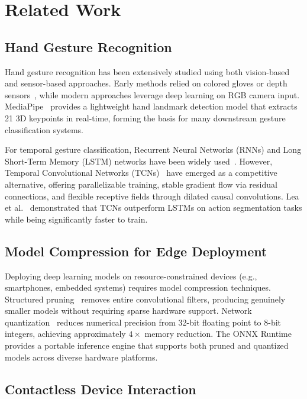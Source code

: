 \section{Related Work}
\label{sec:related_work}

\subsection{Hand Gesture Recognition}

Hand gesture recognition has been extensively studied using both
vision-based and sensor-based approaches. Early methods relied on colored
gloves or depth sensors~\cite{rautaray2015vision}, while modern
approaches leverage deep learning on RGB camera input.
MediaPipe~\cite{zhang2020mediapipe} provides a lightweight hand
landmark detection model that extracts 21 3D keypoints in real-time,
forming the basis for many downstream gesture classification systems.

For temporal gesture classification, Recurrent Neural Networks (RNNs)
and Long Short-Term Memory (LSTM) networks have been widely
used~\cite{pigou2018gesture}. However, Temporal Convolutional Networks
(TCNs)~\cite{bai2018empirical, lea2017temporal} have emerged as a
competitive alternative, offering parallelizable training, stable
gradient flow via residual connections, and flexible receptive fields
through dilated causal convolutions. Lea et al.~\cite{lea2017temporal}
demonstrated that TCNs outperform LSTMs on action segmentation tasks
while being significantly faster to train.

\subsection{Model Compression for Edge Deployment}

Deploying deep learning models on resource-constrained devices (e.g.,
smartphones, embedded systems) requires model compression techniques.
Structured pruning~\cite{li2017pruning} removes entire convolutional
filters, producing genuinely smaller models without requiring sparse
hardware support. Network quantization~\cite{jacob2018quantization}
reduces numerical precision from 32-bit floating point to 8-bit
integers, achieving approximately $4\times$ memory reduction. The ONNX
Runtime~\cite{onnxruntime} provides a portable inference engine that
supports both pruned and quantized models across diverse hardware
platforms.

\subsection{Contactless Device Interaction}

